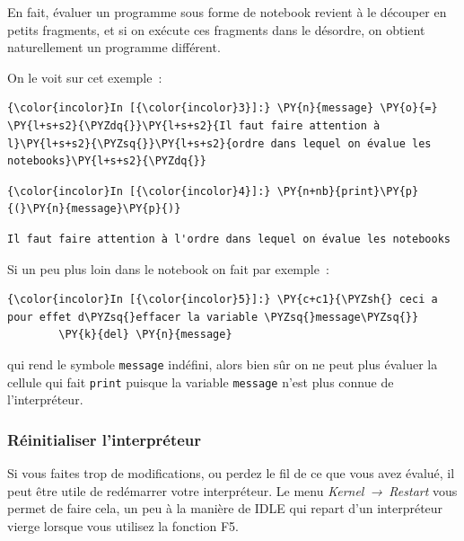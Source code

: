En fait, évaluer un programme sous forme de notebook revient à le
découper en petits fragments, et si on exécute ces fragments dans le
désordre, on obtient naturellement un programme différent.

    On le voit sur cet exemple~:

    \begin{Verbatim}[commandchars=\\\{\}]
{\color{incolor}In [{\color{incolor}3}]:} \PY{n}{message} \PY{o}{=} \PY{l+s+s2}{\PYZdq{}}\PY{l+s+s2}{Il faut faire attention à l}\PY{l+s+s2}{\PYZsq{}}\PY{l+s+s2}{ordre dans lequel on évalue les notebooks}\PY{l+s+s2}{\PYZdq{}}
\end{Verbatim}


    \begin{Verbatim}[commandchars=\\\{\}]
{\color{incolor}In [{\color{incolor}4}]:} \PY{n+nb}{print}\PY{p}{(}\PY{n}{message}\PY{p}{)}
\end{Verbatim}


    \begin{Verbatim}[commandchars=\\\{\}]
Il faut faire attention à l'ordre dans lequel on évalue les notebooks

    \end{Verbatim}

    Si un peu plus loin dans le notebook on fait par exemple~:

    \begin{Verbatim}[commandchars=\\\{\}]
{\color{incolor}In [{\color{incolor}5}]:} \PY{c+c1}{\PYZsh{} ceci a pour effet d\PYZsq{}effacer la variable \PYZsq{}message\PYZsq{}}
        \PY{k}{del} \PY{n}{message}
\end{Verbatim}


    qui rend le symbole \texttt{message} indéfini, alors bien sûr on ne peut
plus évaluer la cellule qui fait \texttt{print} puisque la variable
\texttt{message} n'est plus connue de l'interpréteur.

    \hypertarget{ruxe9initialiser-linterpruxe9teur}{%
\subsubsection{Réinitialiser
l'interpréteur}\label{ruxe9initialiser-linterpruxe9teur}}

    Si vous faites trop de modifications, ou perdez le fil de ce que vous
avez évalué, il peut être utile de redémarrer votre interpréteur. Le
menu \emph{Kernel~→~Restart} vous permet de faire cela, un peu à la
manière de IDLE qui repart d'un interpréteur vierge lorsque vous
utilisez la fonction F5.

